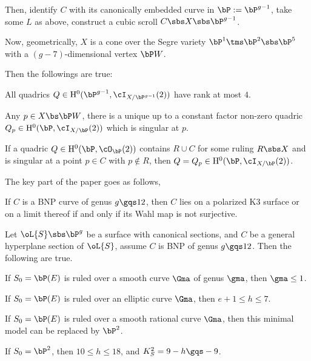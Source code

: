 \documentclass[a4paper, twoside]{article}
\begin{document}
Then, identify $C$ with its canonically embedded curve in $\bP:=\bP^{g-1}$, take some $L$ as above, construct a cubic scroll $C\sbs X\sbs\bP^{g-1}$.

Now, geometrically, $X$ is a cone over the Segre variety $\bP^{1}\tms\bP^{2}\sbs\bP^{5}$ with a $(g-7)$-dimensional vertex $\bP W$.


Then the followings are true:

\begin{lem}
	\begin{enr}
		\item All quadrics $Q\in \mathrm{H}_{}^{0}(\bP^{g-1},\cI_{X/\bP^{g-1}}(2))$ have rank at most $4$.
		\item Any $p\in X\bs\bP W$, there is a unique up to a constant factor non-zero quadric $Q_{p}\in \mathrm{H}_{}^{0}(\bP,\cI_{X/\bP}(2))$ which is singular at $p$.
		\item If a quadric $Q\in \mathrm{H}_{}^{0}(\bP,\cO_{\bP}(2))$ contains $R\cup C$ for some ruling $R\sbs X$ and is singular at a point $p\in C$ with $p\nin R$, then $Q=Q_{p}\in \mathrm{H}_{}^{0}(\bP,\cI_{X/\bP}(2))$.
	\end{enr}
\end{lem}




The key part of the paper goes as follows,
\begin{thm}
	If $C$ is a BNP curve of genus $g\gqs12$, then $C$ lies on a polarized K3 surface or on a limit thereof if and only if its Wahl map is not surjective.
\end{thm}

\begin{prp}
	Let $\oL{S}\sbs\bP^{g}$ be a surface with canonical sections, and $C$ be a general hyperplane section of $\oL{S}$, assume $C$ is BNP of genus $g\gqs12$. Then the following are true.
	\begin{enr}
		\item If $S_{0}=\bP(E)$ is ruled over a smooth curve $\Gma$ of genus $\gma$, then $\gma\leq 1$.
		\begin{enr}
			\item If $S_{0}=\bP(E)$ is ruled over an elliptic curve $\Gma$, then $e+1\leq h\leq 7$.
			\item If $S_{0}=\bP(E)$ is ruled over a smooth rational curve $\Gma$, then this minimal model can be replaced by $\bP^{2}$.
		\end{enr}
		\item If $S_{0}=\bP^{2}$, then $10\leq h\leq 18$, and $K_{S}^{2}=9-h\gqs-9$.
	\end{enr}
\end{prp}
\end{document}
